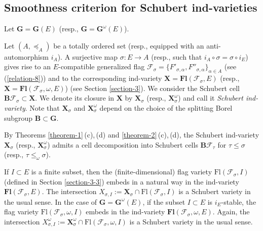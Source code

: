 \documentclass[12pt]{amsart}
\theoremstyle{definition}
\begin{document}
\subsection{Smoothness criterion for Schubert ind-varieties}
\label{section-6-2}

Let $\mathbf{G}=\mathbf{G}(E)$ (resp., $\mathbf{G}=\mathbf{G}^\omega(E)$).

Let $(A,\preceq_A)$ be a totally ordered set (resp., equipped with an anti-automorphism $i_A$).
A surjective map
 $\sigma:E\to A$ (resp., such that $i_A\circ \sigma=\sigma\circ i_E$)
gives rise to an $E$-compatible generalized flag $\mathcal{F}_\sigma=\{F'_{\sigma,\alpha},F''_{\sigma,\alpha}\}_{\alpha\in A}$ (see (\ref{relation-8})) and to the corresponding ind-variety $\mathbf{X}=\mathbf{Fl}(\mathcal{F}_\sigma,E)$ (resp., $\mathbf{X}=\mathbf{Fl}(\mathcal{F}_\sigma,\omega,E)$) (see Section \ref{section-3}). We consider the Schubert cell $\mathbf{B}\mathcal{F}_\sigma\subset\mathbf{X}$.
We denote its closure in $\mathbf{X}$ by $\mathbf{X}_\sigma$ (resp., $\mathbf{X}_\sigma^\omega$) and call it {\em Schubert ind-variety}.
Note that $\mathbf{X}_\sigma$ and $\mathbf{X}_\sigma^\omega$ depend on the choice of the splitting Borel subgroup $\mathbf{B}\subset\mathbf{G}$.

By Theorems \ref{theorem-1}\,{\rm (c)},\,{\rm (d)} and \ref{theorem-2}\,{\rm (c)},\,{\rm (d)}, the Schubert ind-variety $\mathbf{X}_\sigma$ (resp., $\mathbf{X}_\sigma^\omega$) admits a cell decomposition into Schubert cells $\mathbf{B}\mathcal{F}_\tau$ for $\tau\leq\sigma$ (resp., $\tau\leq_\omega\sigma$).

If $I\subset E$ is a finite subset, then the (finite-dimensional) flag variety $\mathrm{Fl}(\mathcal{F}_\sigma,I)$ (defined in Section \ref{section-3-3}) embeds in a natural way in the ind-variety $\mathbf{Fl}(\mathcal{F}_\sigma,E)$. The intersection $X_{\sigma,I}:=\mathbf{X}_\sigma\cap\mathrm{Fl}(\mathcal{F}_\sigma,I)$
is a Schubert variety in the usual sense. In the case of $\mathbf{G}=\mathbf{G}^\omega(E)$, if the subset $I\subset E$ is $i_E$-stable, the flag variety $\mathrm{Fl}(\mathcal{F}_\sigma,\omega,I)$ embeds in the ind-variety $\mathbf{Fl}(\mathcal{F}_\sigma,\omega,E)$. Again, the intersection $X_{\sigma,I}^\omega:=\mathbf{X}_\sigma^\omega\cap\mathrm{Fl}(\mathcal{F}_\sigma,\omega,I)$ is a Schubert variety in the usual sense.
\end{document}
